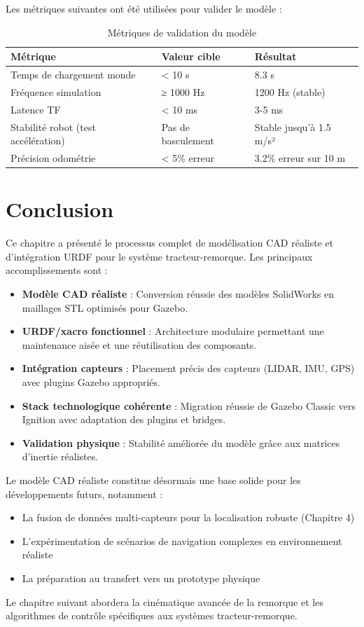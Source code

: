 \documentclass[a4paper,12pt]{report}
\begin{document}
Les métriques suivantes ont été utilisées pour valider le modèle :

\begin{table}[htbp]
\centering
\caption{Métriques de validation du modèle}
\begin{tabular}{@{}llp{6cm}@{}}
\toprule
\textbf{Métrique} & \textbf{Valeur cible} & \textbf{Résultat} \\
\midrule
Temps de chargement monde & < 10 s & 8.3 s \\
Fréquence simulation & ≥ 1000 Hz & 1200 Hz (stable) \\
Latence TF & < 10 ms & 3-5 ms \\
Stabilité robot (test accélération) & Pas de basculement & Stable jusqu'à 1.5 m/s² \\
Précision odométrie & < 5\% erreur & 3.2\% erreur sur 10 m \\
\bottomrule
\end{tabular}
\end{table}

\section{Conclusion}

Ce chapitre a présenté le processus complet de modélisation CAD réaliste et d'intégration URDF pour le système tracteur-remorque. Les principaux accomplissements sont :

\begin{itemize}
    \item \textbf{Modèle CAD réaliste} : Conversion réussie des modèles SolidWorks en maillages STL optimisés pour Gazebo.
    \item \textbf{URDF/xacro fonctionnel} : Architecture modulaire permettant une maintenance aisée et une réutilisation des composants.
    \item \textbf{Intégration capteurs} : Placement précis des capteurs (LIDAR, IMU, GPS) avec plugins Gazebo appropriés.
    \item \textbf{Stack technologique cohérente} : Migration réussie de Gazebo Classic vers Ignition avec adaptation des plugins et bridges.
    \item \textbf{Validation physique} : Stabilité améliorée du modèle grâce aux matrices d'inertie réalistes.
\end{itemize}

Le modèle CAD réaliste constitue désormais une base solide pour les développements futurs, notamment :

\begin{itemize}
    \item La fusion de données multi-capteurs pour la localisation robuste (Chapitre 4)
    \item L'expérimentation de scénarios de navigation complexes en environnement réaliste
    \item La préparation au transfert vers un prototype physique
\end{itemize}

Le chapitre suivant abordera la cinématique avancée de la remorque et les algorithmes de contrôle spécifiques aux systèmes tracteur-remorque.
\end{document}
